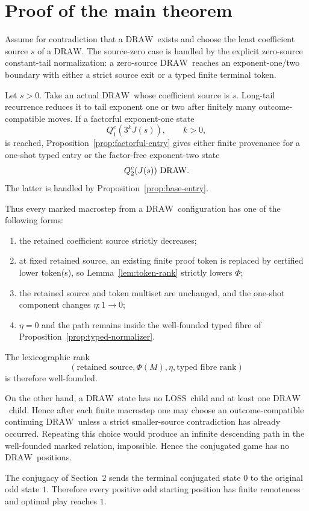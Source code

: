 \documentclass[11pt]{article}
\newcommand{\LOSS}{\ensuremath{\mathrm{LOSS}}}
\newcommand{\DRAW}{\ensuremath{\mathrm{DRAW}}}
\begin{document}
\section{Proof of the main theorem}

Assume for contradiction that a \DRAW\ exists and choose the least coefficient
source $s$ of a \DRAW. The source-zero case is handled by the explicit
zero-source constant-tail normalization: a zero-source \DRAW\ reaches an
exponent-one/two boundary with either a strict source exit or a typed finite
terminal token.

Let $s>0$. Take an actual \DRAW\ whose coefficient source is $s$. Long-tail
recurrence reduces it to tail exponent one or two after finitely many
outcome-compatible moves. If a factorful exponent-one state
\[
  Q_1^e(3^kJ(s)),\qquad k>0,
\]
is reached, Proposition~\ref{prop:factorful-entry} gives either finite
provenance for a one-shot typed entry or the factor-free exponent-two state
\[
  Q_2^e(J(s))\text{ \DRAW}.
\]
The latter is handled by Proposition~\ref{prop:base-entry}.

Thus every marked macrostep from a \DRAW\ configuration has one of the following
forms:
\begin{enumerate}[label=(\roman*)]
\item the retained coefficient source strictly decreases;
\item at fixed retained source, an existing finite proof token is replaced by
      certified lower token(s), so Lemma~\ref{lem:token-rank} strictly lowers
      $\Phi$;
\item the retained source and token multiset are unchanged, and the one-shot
      component changes $\eta:1\to0$;
\item $\eta=0$ and the path remains inside the well-founded typed fibre of
      Proposition~\ref{prop:typed-normalizer}.
\end{enumerate}
The lexicographic rank
\[
  (\text{retained source},\Phi(M),\eta,\text{typed fibre rank})
\]
is therefore well-founded.

On the other hand, a \DRAW\ state has no \LOSS\ child and at least one \DRAW\
child. Hence after each finite macrostep one may choose an outcome-compatible
continuing \DRAW\ unless a strict smaller-source contradiction has already
occurred. Repeating this choice would produce an infinite descending path in the
well-founded marked relation, impossible. Hence the conjugated game has no
\DRAW\ positions.

The conjugacy of Section~2 sends the terminal conjugated state $0$ to the
original odd state $1$. Therefore every positive odd starting position has finite
remoteness and optimal play reaches $1$.
\end{document}
